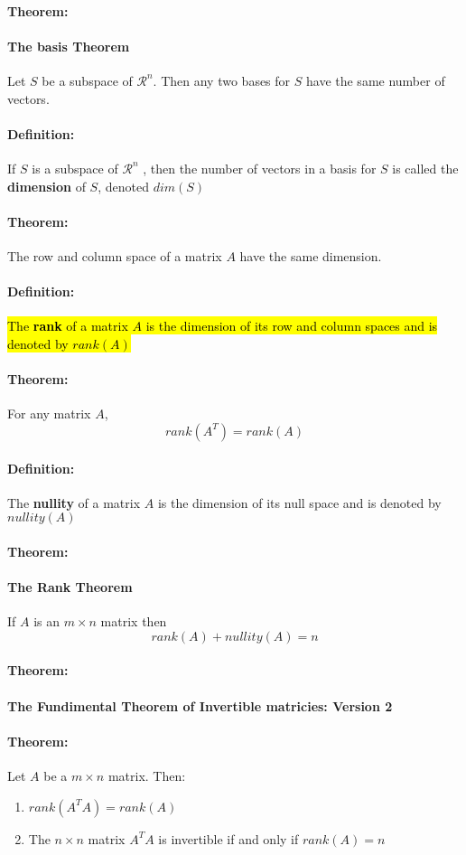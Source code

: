 \documentclass[12pt]{article}
\newenvironment{theorem}{\paragraph{Theorem:\hfill}}{\hfill}
\newenvironment{definition}{\paragraph{Definition: }}{\hfill}
\begin{document}
\begin{theorem}
	\paragraph{The basis Theorem}
	Let $S$ be a subspace of $\mathcal{R}^n$. Then any two bases for $S$ have the same number of vectors.
\end{theorem}

\begin{definition}
	If $S$ is a subspace of $\mathcal{R}^n$ , then the number of vectors in a basis for $S$ is called the \textbf{dimension} of $S$, denoted $dim(S)$
\end{definition}

\begin{theorem}
	The row and column space of a matrix $A$ have the same dimension.
\end{theorem}

\begin{definition}
	\hl{The \textbf{rank} of a matrix $A$ is the dimension of its row and column spaces and is denoted by $rank(A)$}
\end{definition}

\begin{theorem}
	For any matrix $A$,
	\[
	rank(A^T) = rank(A)
	\]
\end{theorem}

\begin{definition}
	The \textbf{nullity}  of a matrix $A$ is the dimension of its null space and is denoted by $nullity(A)$
\end{definition}

\begin{theorem}
	\paragraph{The Rank Theorem}
	If $A$ is an $m \times n$ matrix then
	\[
	rank(A) + nullity(A) = n
	\]
\end{theorem}

\begin{theorem}
	\paragraph{The Fundimental Theorem of Invertible matricies: Version 2}
\end{theorem}

\begin{theorem}
	Let $A$ be a $m \times n$ matrix. Then:
	\begin{enumerate}
		\item $rank(A^T A) = rank(A)$
		\item The $n \times n$ matrix $A^T A$ is invertible if and only if $rank(A)
 = n$
	\end{enumerate}
\end{theorem}
\end{document}
